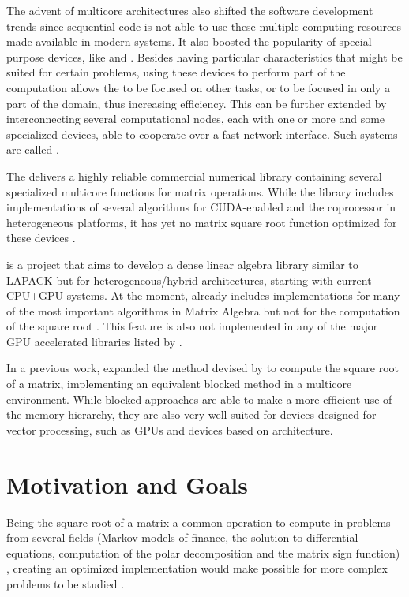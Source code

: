 \documentclass[../thesis]{subfiles}
\begin{document}
	The advent of multicore architectures also shifted the software development trends since sequential code is not able to use these multiple computing resources made available in modern systems. It also boosted the popularity of special purpose devices, like \gpus and \dsps. Besides having particular characteristics that might be suited for certain problems, using these devices to perform part of the computation allows the \cpu to be focused on other tasks, or to be focused in only a part of the domain, thus increasing efficiency. This can be further extended by interconnecting several computational nodes, each with one or more \cpus and some specialized devices, able to cooperate over a fast network interface. Such systems are called \hetplats.

	The \nag\cite{NAG} delivers a highly reliable commercial numerical library containing several specialized multicore functions for matrix operations. While the \nag library includes implementations of several algorithms for CUDA-enabled \gpus and the \intel\xeonphi coprocessor in heterogeneous platforms, it has yet no matrix square root function optimized for these devices \cite{NAG:GPU:0:6,NAG:MIC}.

	\magma is a project that aims to develop a dense linear algebra library similar to LAPACK but for heterogeneous/hybrid architectures, starting with current CPU+GPU systems. At the moment, \magma already includes implementations for many of the most important algorithms in Matrix Algebra but not for the computation of the square root \cite{PLASMA:MAGMA}. This feature is also not implemented in any of the major GPU accelerated libraries listed by \nvidia \cite{ACCELEREYES:WIKI:SQRTM,CULA:LAPACK,NVIDIA:CUBLAS:5:0,NVIDIA:CUSPARSE:5:0,CUSP:FEATURES}.

	In a previous work,  expanded the method devised by  to compute the square root of a matrix, implementing an equivalent blocked method in a multicore environment. While blocked approaches are able to make a more efficient use of the memory hierarchy, they are also very well suited for devices designed for vector processing, such as \acfp{GPU} and devices based on \intel\mic architecture.

	\section{Motivation and Goals}
	Being the square root of a matrix a common operation to compute in problems from several fields (Markov models of finance, the solution to differential equations, computation of the polar decomposition and the matrix sign function) \cite{Higham:2008:FM}, creating an optimized implementation would make possible for more complex problems to be studied \cite{Gustafson:1988}.
\end{document}
